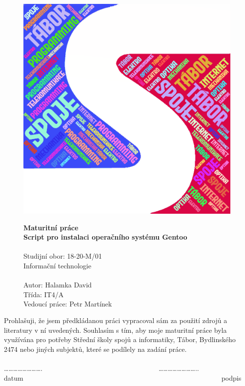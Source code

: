 \documentclass[12pt,a4paper,twoside,]{article}
\begin{document}
\begin{figure}[h!]
\centering
\includegraphics[scale=0.5,]{obrazky/sssi_logo.png}


	
\textsf{\textbf{\Huge Maturitní práce\\}}
\textsf{ \textbf{\Huge Script pro instalaci operačního systému Gentoo \\}}
\textsf{ \Huge \\Studijní obor: 18-20-M/01 \\Informační technologie\\}
\textsf{\LARGE \\Autor: Halamka David\\
Třída: IT4/A\\
Vedoucí práce: Petr Martínek
}
\thispagestyle{empty}
\end{figure}


\newpage
\thispagestyle{empty}
Prohlašuji, že jsem předkládanou práci vypracoval sám za použití zdrojů a literatury v ní uvedených. Souhlasím s tím, aby moje maturitní práce byla využívána pro potřeby Střední školy spojů a informatiky, Tábor, Bydlinského 2474 nebo jiných subjektů, které se podílely na zadání práce.\\ 
\\	…………………….~~~~~~~~~~~~~~~~~~~~~~~~~~~~~~~~~~……………………..\\
datum~~~~~~~~~~~~~~~~~~~~~~~~~~~~~~~~~~~~~~~~~~~~~~~~~~~~~~~~~~podpis
\end{document}

